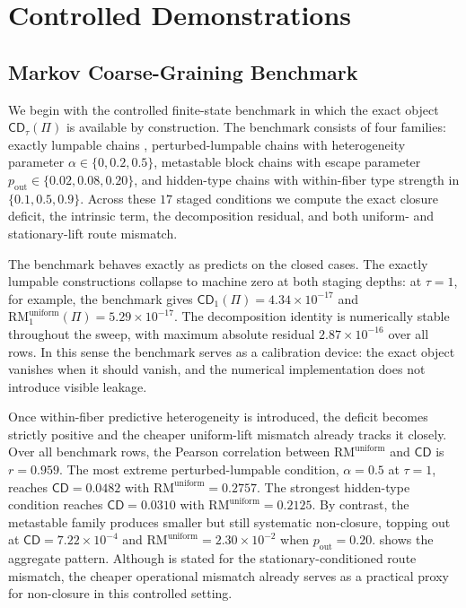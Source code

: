 \documentclass[11pt]{article}
\numberwithin{equation}{section}
\begin{document}
 \section{Controlled Demonstrations}\label{sec:results}

\subsection{Markov Coarse-Graining Benchmark}\label{sec:results-markov}

We begin with the controlled finite-state benchmark in which the exact object $\mathsf{CD}_\tau(\Pi)$ is available by construction. The benchmark consists of four families: exactly lumpable chains \citep{kemeny1976finitemarkovchains,buchholz1994exactordinarylumpability}, perturbed-lumpable chains with heterogeneity parameter $\alpha \in \{0,0.2,0.5\}$, metastable block chains with escape parameter $p_{\mathrm{out}} \in \{0.02,0.08,0.20\}$, and hidden-type chains with within-fiber type strength in $\{0.1,0.5,0.9\}$. Across these $17$ staged conditions we compute the exact closure deficit, the intrinsic term, the decomposition residual, and both uniform- and stationary-lift route mismatch.

The benchmark behaves exactly as  predicts on the closed cases. The exactly lumpable constructions collapse to machine zero at both staging depths: at $\tau=1$, for example, the benchmark gives $\mathsf{CD}_1(\Pi)=4.34\times 10^{-17}$ and $\mathrm{RM}^{\mathrm{uniform}}_1(\Pi)=5.29\times 10^{-17}$. The decomposition identity is numerically stable throughout the sweep, with maximum absolute residual $2.87\times 10^{-16}$ over all rows. In this sense the benchmark serves as a calibration device: the exact object vanishes when it should vanish, and the numerical implementation does not introduce visible leakage.

Once within-fiber predictive heterogeneity is introduced, the deficit becomes strictly positive and the cheaper uniform-lift mismatch already tracks it closely. Over all benchmark rows, the Pearson correlation between $\mathrm{RM}^{\mathrm{uniform}}$ and $\mathsf{CD}$ is $r=0.959$. The most extreme perturbed-lumpable condition, $\alpha=0.5$ at $\tau=1$, reaches $\mathsf{CD}=0.0482$ with $\mathrm{RM}^{\mathrm{uniform}}=0.2757$. The strongest hidden-type condition reaches $\mathsf{CD}=0.0310$ with $\mathrm{RM}^{\mathrm{uniform}}=0.2125$. By contrast, the metastable family produces smaller but still systematic non-closure, topping out at $\mathsf{CD}=7.22\times 10^{-4}$ and $\mathrm{RM}^{\mathrm{uniform}}=2.30\times 10^{-2}$ when $p_{\mathrm{out}}=0.20$.  shows the aggregate pattern. Although  is stated for the stationary-conditioned route mismatch, the cheaper operational mismatch already serves as a practical proxy for non-closure in this controlled setting.
\end{document}
